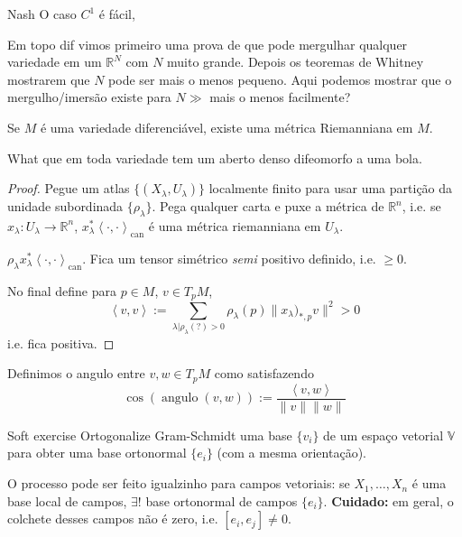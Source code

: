 \begin{thing7}{Nash}\leavevmode
O caso \(C^1\) é fácil, 
\end{thing7}

\begin{question}[dani]\leavevmode
Em topo dif vimos primeiro uma prova de que pode mergulhar qualquer variedade em um \(\mathbb{R}^N\) com \(N\) muito grande. Depois os teoremas de Whitney mostrarem que \(N\) pode ser mais o menos pequeno. Aqui podemos mostrar que o mergulho/imersão existe para \(N\gg\) mais o menos facilmente?
\end{question}

\begin{prop}\leavevmode
Se \(M\) é uma variedade diferenciável, existe uma métrica Riemanniana em \(M\).
\end{prop}

\begin{thing6}{What}\leavevmode
que em toda variedade tem um aberto denso difeomorfo a uma bola.
\end{thing6}

\begin{proof}\leavevmode
Pegue um atlas \(\{(X_\lambda,U_\lambda)\}\) localmente finito para usar uma partição da unidade subordinada  \(\{\rho_\lambda\}\). Pega qualquer carta e puxe a métrica de \(\mathbb{R}^n\), i.e. se \(x_\lambda:U_\lambda \longrightarrow \mathbb{R}^n\), \(x^* _\lambda \left<\cdot,\cdot\right>_{\operatorname{can}}\) é uma métrica riemanniana em \(U_\lambda\).

\(\rho_\lambda x^* _\lambda \left<\cdot,\cdot\right>_{\operatorname{can}}\). Fica um tensor simétrico \textit{semi} positivo definido, i.e. \(\geq 0\).

No final define para \(p \in M\), \(v \in T_pM\),
\[\left<v,v\right>:=\sum_{\lambda | \rho_\lambda(?)>0}\rho_\lambda(p)\|x_\lambda)_{*,p}v\|^2>0\]
i.e. fica positiva.
\end{proof}

Definimos o angulo entre \(v,w \in T_pM\) como satisfazendo
\[\cos (\operatorname{a n g u l o}(v,w)):=\frac{\left<v,w\right>}{\|v\|\|w\|}\]

\begin{thing7}{Soft exercise}\leavevmode
Ortogonalize Gram-Schmidt uma base \(\{v_i\}\) de um espaço vetorial \(\mathbb{V}\) para obter uma base ortonormal \(\{e_i\}\) (com a mesma orientação).
\end{thing7}

\begin{remark}\leavevmode
	O processo pode ser feito igualzinho para campos vetoriais: se \(X_1,\ldots,X_n\) é uma base local de campos, \(\exists !\) base ortonormal de campos \(\{e_i\}\). \textbf{Cuidado:} em geral, o colchete desses campos não é zero, i.e.  \([e_i,e_j] \neq 0\).
\end{remark}

